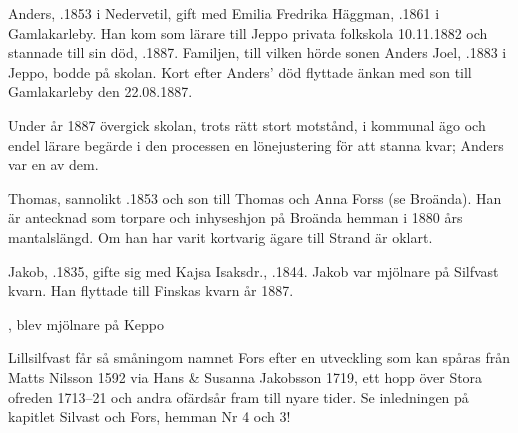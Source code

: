 Anders, .1853 i Nedervetil, gift med Emilia Fredrika Häggman, .1861 i Gamlakarleby. Han kom som lärare till Jeppo privata folkskola 10.11.1882 och stannade till sin död, .1887. Familjen, till vilken hörde sonen Anders Joel, .1883 i Jeppo, bodde på skolan. Kort efter Anders' död flyttade änkan med son till Gamlakarleby den 22.08.1887.

Under år 1887 övergick skolan, trots rätt stort motstånd, i kommunal ägo och endel lärare begärde i den processen en lönejustering för att stanna kvar; Anders var en av dem.


Thomas, sannolikt .1853 och son till Thomas och Anna Forss (se Broända). Han är antecknad som torpare och inhyseshjon på Broända hemman i 1880 års mantalslängd. Om han har varit kortvarig ägare till Strand är oklart.\jhvspace{}


Jakob, .1835, gifte sig med Kajsa Isaksdr., .1844. Jakob var mjölnare på Silfvast kvarn. Han flyttade till Finskas kvarn år 1887.
\begin{jhchildren}
  \item {}, blev mjölnare på Keppo
  \item {}
  \item {}
  \item {}
  \item {}
  \item {}
\end{jhchildren}



Lillsilfvast får så småningom namnet Fors efter en utveckling som kan spåras från Matts Nilsson 1592 via Hans \& Susanna Jakobsson 1719, ett hopp över Stora ofreden 1713--21 och andra ofärdsår fram till nyare tider. Se inledningen på kapitlet Silvast och Fors, hemman Nr 4 och 3!





